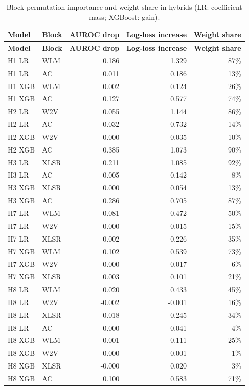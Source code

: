 \documentclass[10pt,a4paper]{article}
\begin{document}
\begin{center}\tiny\renewcommand{\arraystretch}{1.12}
\begin{longtable}{llrrr}
\caption{Block permutation importance and weight share in hybrids (LR: coefficient mass; XGBoost: gain).}\\
\toprule
\textbf{Model} & \textbf{Block} & \textbf{AUROC drop} & \textbf{Log-loss increase} & \textbf{Weight share}\\\midrule\endfirsthead
\toprule
\textbf{Model} & \textbf{Block} & \textbf{AUROC drop} & \textbf{Log-loss increase} & \textbf{Weight share}\\\midrule\endhead
\bottomrule\endfoot
H1 LR & WLM & 0.186 & 1.329 & 87\%\\
H1 LR & AC & 0.011 & 0.186 & 13\%\\
H1 XGB & WLM & 0.002 & 0.124 & 26\%\\
H1 XGB & AC & 0.127 & 0.577 & 74\%\\
H2 LR & W2V & 0.055 & 1.144 & 86\%\\
H2 LR & AC & 0.032 & 0.732 & 14\%\\
H2 XGB & W2V & -0.000 & 0.035 & 10\%\\
H2 XGB & AC & 0.385 & 1.073 & 90\%\\
H3 LR & XLSR & 0.211 & 1.085 & 92\%\\
H3 LR & AC & 0.005 & 0.142 & 8\%\\
H3 XGB & XLSR & 0.000 & 0.054 & 13\%\\
H3 XGB & AC & 0.286 & 0.705 & 87\%\\
H7 LR & WLM & 0.081 & 0.472 & 50\%\\
H7 LR & W2V & -0.000 & 0.015 & 15\%\\
H7 LR & XLSR & 0.002 & 0.226 & 35\%\\
H7 XGB & WLM & 0.102 & 0.539 & 73\%\\
H7 XGB & W2V & -0.000 & 0.017 & 6\%\\
H7 XGB & XLSR & 0.003 & 0.101 & 21\%\\
H8 LR & WLM & 0.020 & 0.433 & 45\%\\
H8 LR & W2V & -0.002 & -0.001 & 16\%\\
H8 LR & XLSR & 0.018 & 0.245 & 34\%\\
H8 LR & AC & 0.000 & 0.041 & 4\%\\
H8 XGB & WLM & 0.001 & 0.111 & 25\%\\
H8 XGB & W2V & -0.000 & 0.001 & 1\%\\
H8 XGB & XLSR & -0.000 & 0.020 & 3\%\\
H8 XGB & AC & 0.100 & 0.583 & 71\%\\
\end{longtable}\end{center}
\end{document}
